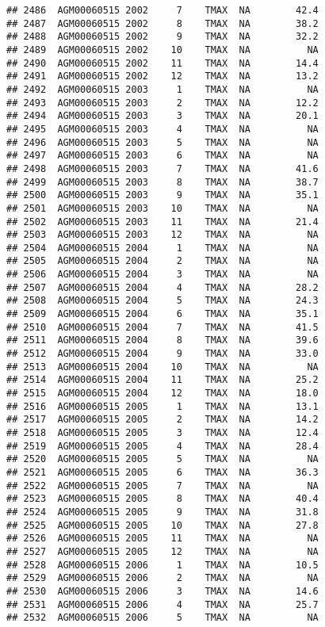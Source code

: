 \documentclass{article}\usepackage[]{graphicx}\usepackage[]{color}
\makeatletter
\newenvironment{kframe}{%
 \def\at@end@of@kframe{}%
 \ifinner\ifhmode%
  \def\at@end@of@kframe{\end{minipage}}%
  \begin{minipage}{\columnwidth}%
 \fi\fi%
 \def\FrameCommand##1{\hskip\@totalleftmargin \hskip-\fboxsep
 \colorbox{shadecolor}{##1}\hskip-\fboxsep
     \hskip-\linewidth \hskip-\@totalleftmargin \hskip\columnwidth}%
 \MakeFramed {\advance\hsize-\width
   \@totalleftmargin\z@ \linewidth\hsize
   \@setminipage}}%
 {\par\unskip\endMakeFramed%
 \at@end@of@kframe}
\newenvironment{knitrout}{}{} %
\makeatother
\begin{document}
\begin{knitrout}
\begin{kframe}
\begin{verbatim}
## 2486  AGM00060515 2002     7    TMAX  NA        42.4
## 2487  AGM00060515 2002     8    TMAX  NA        38.2
## 2488  AGM00060515 2002     9    TMAX  NA        32.2
## 2489  AGM00060515 2002    10    TMAX  NA          NA
## 2490  AGM00060515 2002    11    TMAX  NA        14.4
## 2491  AGM00060515 2002    12    TMAX  NA        13.2
## 2492  AGM00060515 2003     1    TMAX  NA          NA
## 2493  AGM00060515 2003     2    TMAX  NA        12.2
## 2494  AGM00060515 2003     3    TMAX  NA        20.1
## 2495  AGM00060515 2003     4    TMAX  NA          NA
## 2496  AGM00060515 2003     5    TMAX  NA          NA
## 2497  AGM00060515 2003     6    TMAX  NA          NA
## 2498  AGM00060515 2003     7    TMAX  NA        41.6
## 2499  AGM00060515 2003     8    TMAX  NA        38.7
## 2500  AGM00060515 2003     9    TMAX  NA        35.1
## 2501  AGM00060515 2003    10    TMAX  NA          NA
## 2502  AGM00060515 2003    11    TMAX  NA        21.4
## 2503  AGM00060515 2003    12    TMAX  NA          NA
## 2504  AGM00060515 2004     1    TMAX  NA          NA
## 2505  AGM00060515 2004     2    TMAX  NA          NA
## 2506  AGM00060515 2004     3    TMAX  NA          NA
## 2507  AGM00060515 2004     4    TMAX  NA        28.2
## 2508  AGM00060515 2004     5    TMAX  NA        24.3
## 2509  AGM00060515 2004     6    TMAX  NA        35.1
## 2510  AGM00060515 2004     7    TMAX  NA        41.5
## 2511  AGM00060515 2004     8    TMAX  NA        39.6
## 2512  AGM00060515 2004     9    TMAX  NA        33.0
## 2513  AGM00060515 2004    10    TMAX  NA          NA
## 2514  AGM00060515 2004    11    TMAX  NA        25.2
## 2515  AGM00060515 2004    12    TMAX  NA        18.0
## 2516  AGM00060515 2005     1    TMAX  NA        13.1
## 2517  AGM00060515 2005     2    TMAX  NA        14.2
## 2518  AGM00060515 2005     3    TMAX  NA        12.4
## 2519  AGM00060515 2005     4    TMAX  NA        28.4
## 2520  AGM00060515 2005     5    TMAX  NA          NA
## 2521  AGM00060515 2005     6    TMAX  NA        36.3
## 2522  AGM00060515 2005     7    TMAX  NA          NA
## 2523  AGM00060515 2005     8    TMAX  NA        40.4
## 2524  AGM00060515 2005     9    TMAX  NA        31.8
## 2525  AGM00060515 2005    10    TMAX  NA        27.8
## 2526  AGM00060515 2005    11    TMAX  NA          NA
## 2527  AGM00060515 2005    12    TMAX  NA          NA
## 2528  AGM00060515 2006     1    TMAX  NA        10.5
## 2529  AGM00060515 2006     2    TMAX  NA          NA
## 2530  AGM00060515 2006     3    TMAX  NA        14.6
## 2531  AGM00060515 2006     4    TMAX  NA        25.7
## 2532  AGM00060515 2006     5    TMAX  NA          NA

\end{verbatim}
\end{kframe}
\end{knitrout}
\end{document}

